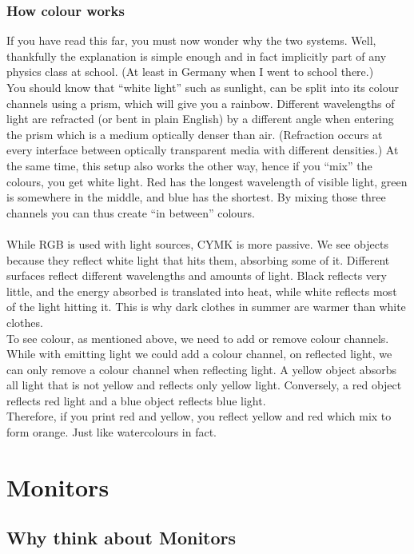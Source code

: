 \subsubsection{How colour works}

If you have read this far, you must now wonder why the two systems. Well, thankfully the explanation is simple enough and in fact implicitly part of any physics class at school. (At least in Germany when I went to school there.)
\\
You should know that ``white light'' such as sunlight, can be split into its colour channels using a prism, which will give you a rainbow. Different wavelengths of light are refracted (or bent in plain English) by a different angle when entering the prism which is a medium optically denser than air. (Refraction occurs at every interface between optically transparent media with different densities.) At the same time, this setup also works the other way, hence if you ``mix'' the colours, you get white light. Red has the longest wavelength of visible light, green is somewhere in the middle, and blue has the shortest. By mixing those three channels you can thus create ``in between'' colours.
\\
\\
While RGB is used with light sources, CYMK is more passive. We see objects because they reflect white light that hits them, absorbing some of it. Different surfaces reflect different wavelengths and amounts of light. Black reflects very little, and the energy absorbed is translated into heat, while white reflects most of the light hitting it. This is why dark clothes in summer are warmer than white clothes.
\\
To see colour, as mentioned above, we need to add or remove colour channels. While with emitting light we could add a colour channel, on reflected light, we can only remove a colour channel when reflecting light. A yellow object absorbs all light that is not yellow and reflects only yellow light. Conversely, a red object reflects red light and a blue object reflects blue light.
\\
Therefore, if you print red and yellow, you reflect yellow and red which mix to form orange. Just like watercolours in fact.

\section{Monitors}

\subsection{Why think about Monitors}

